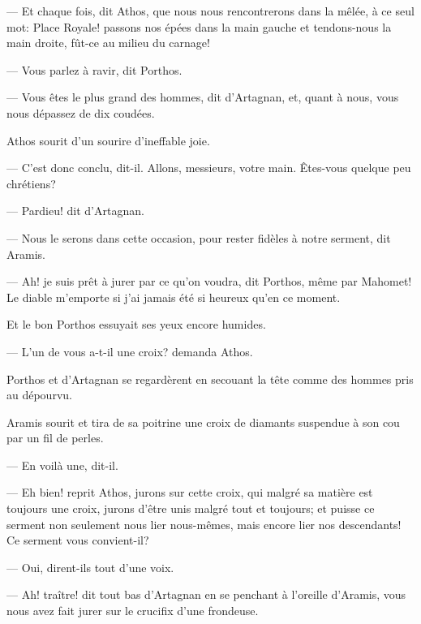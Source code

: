 — Et chaque fois, dit Athos, que nous nous rencontrerons dans la mêlée, à ce seul mot: Place Royale! passons nos épées dans la main gauche et tendons-nous la main droite, fût-ce au milieu du carnage!

— Vous parlez à ravir, dit Porthos.

— Vous êtes le plus grand des hommes, dit d'Artagnan, et, quant à nous, vous nous dépassez de dix coudées.

Athos sourit d'un sourire d'ineffable joie.

— C'est donc conclu, dit-il. Allons, messieurs, votre main. Êtes-vous quelque peu chrétiens?

— Pardieu! dit d'Artagnan.

— Nous le serons dans cette occasion, pour rester fidèles à notre serment, dit Aramis.

— Ah! je suis prêt à jurer par ce qu'on voudra, dit Porthos, même par Mahomet! Le diable m'emporte si j'ai jamais été si heureux qu'en ce moment.

Et le bon Porthos essuyait ses yeux encore humides.

— L'un de vous a-t-il une croix? demanda Athos.

Porthos et d'Artagnan se regardèrent en secouant la tête comme des hommes pris au dépourvu.

Aramis sourit et tira de sa poitrine une croix de diamants suspendue à son cou par un fil de perles.

— En voilà une, dit-il.

— Eh bien! reprit Athos, jurons sur cette croix, qui malgré sa matière est toujours une croix, jurons d'être unis malgré tout et toujours; et puisse ce serment non seulement nous lier nous-mêmes, mais encore lier nos descendants! Ce serment vous convient-il?

— Oui, dirent-ils tout d'une voix.

— Ah! traître! dit tout bas d'Artagnan en se penchant à l'oreille d'Aramis, vous nous avez fait jurer sur le crucifix d'une frondeuse.